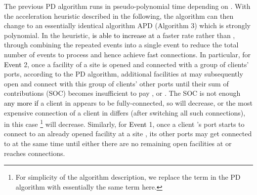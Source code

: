 \documentclass[10pt]{llncs}
\begin{document}
The previous PD algorithm runs in pseudo-polynomial time depending
on . With the acceleration heuristic described in the following,
the algorithm can then change to an essentially identical algorithm
APD (Algorithm 3) which is strongly polynomial. In the heuristic,\textcolor{black}{{}
 is able to increase
at a }faster rate\textcolor{black}{{} }rather than , through combining
the repeated events into a single event to reduce the total number
of events to process and hence achieve fast connections. In particular,
for \textcolor{black}{Event }2, once a facility of a site  is
opened and connected with a group of clients' ports, according to
the PD algorithm, additional facilities at  may subsequently open
and connect with this group of clients' other ports until their sum
of contributions (SOC) becomes insufficient to pay , or .
The SOC is not enough \textcolor{black}{any more if} a client in 
appears to be fully-connected, so 
will decrease, or the most expensive connection of a client in 
differs (after switching all such connections), in this case \footnote{For simplicity of the algorithm description, we replace the term \textcolor{black}{}
in the PD algorithm with essentially the same term here.} will decrease. Similarly, for \textcolor{black}{Event }1, once a
client 's port starts to connect to an already opened facility
at a site , its other ports may get connected to  at the same
time until either there are no remaining open facilities at  or
 reaches  connections. 
\end{document}

